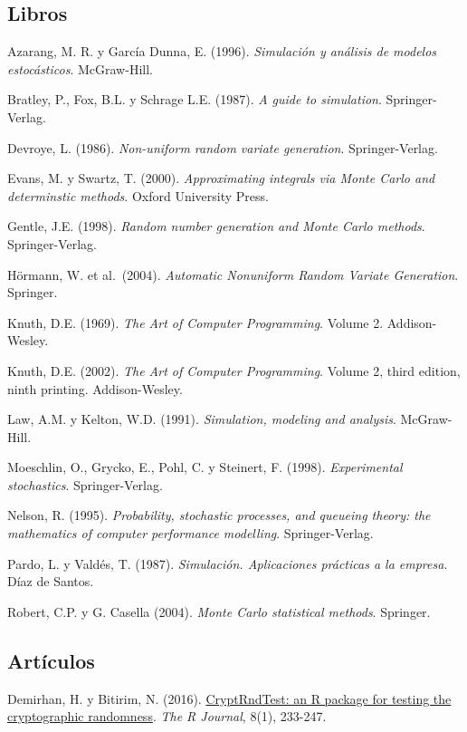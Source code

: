 \documentclass[
]{book}
\theoremstyle{break}
\theoremstyle{definition}
\theoremstyle{definition}
\theoremstyle{definition}
\theoremstyle{remark}
\begin{document}
\hypertarget{libros}{%
\subsection*{Libros}\label{libros}}

Azarang, M. R. y García Dunna, E. (1996). \emph{Simulación y análisis de
modelos estocásticos}. McGraw-Hill.

Bratley, P., Fox, B.L. y Schrage L.E. (1987). \emph{A guide to simulation}.
Springer-Verlag.

Devroye, L. (1986). \emph{Non-uniform random variate generation}.
Springer-Verlag.

Evans, M. y Swartz, T. (2000). \emph{Approximating integrals via Monte Carlo and
determinstic methods}. Oxford University Press.

Gentle, J.E. (1998). \emph{Random number generation and Monte Carlo methods}.
Springer-Verlag.

Hörmann, W. et al.~(2004). \emph{Automatic Nonuniform Random Variate Generation}. Springer.

Knuth, D.E. (1969). \emph{The Art of Computer Programming}. Volume 2. Addison-Wesley.

Knuth, D.E. (2002). \emph{The Art of Computer Programming}. Volume 2, third edition, ninth printing. Addison-Wesley.

Law, A.M. y Kelton, W.D. (1991). \emph{Simulation, modeling and analysis}.
McGraw-Hill.

Moeschlin, O., Grycko, E., Pohl, C. y Steinert, F. (1998). \emph{Experimental
stochastics}. Springer-Verlag.

Nelson, R. (1995). \emph{Probability, stochastic processes, and queueing
theory: the mathematics of computer performance modelling}.
Springer-Verlag.

Pardo, L. y Valdés, T. (1987). \emph{Simulación. Aplicaciones prácticas a la
empresa}. Díaz de Santos.

Robert, C.P. y G. Casella (2004). \emph{Monte Carlo statistical methods}. Springer.

\hypertarget{artuxedculos}{%
\subsection*{Artículos}\label{artuxedculos}}

Demirhan, H. y Bitirim, N. (2016). \href{https://journal.r-project.org/archive/2016/RJ-2016-016/index.html}{CryptRndTest: an R package for testing the cryptographic randomness}.
\emph{The R Journal}, 8(1), 233-247.
\end{document}
